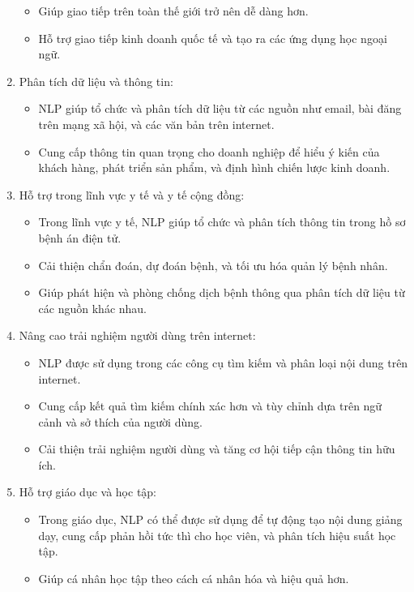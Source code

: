 \begin{enumerate}
\begin{itemize}
            \item Giúp giao tiếp trên toàn thế giới trở nên dễ dàng hơn.
            \item Hỗ trợ giao tiếp kinh doanh quốc tế và tạo ra các ứng dụng học ngoại ngữ.
        \end{itemize}
        \clearpage
        \item Phân tích dữ liệu và thông tin:
        \begin{itemize}
            \item NLP giúp tổ chức và phân tích dữ liệu từ các nguồn như email, bài đăng trên mạng xã hội, và các văn bản trên internet.
            \item Cung cấp thông tin quan trọng cho doanh nghiệp để hiểu ý kiến của khách hàng, phát triển sản phẩm, và định hình chiến lược kinh doanh.
        \end{itemize}
        \item Hỗ trợ trong lĩnh vực y tế và y tế cộng đồng:
        \begin{itemize}
            \item Trong lĩnh vực y tế, NLP giúp tổ chức và phân tích thông tin trong hồ sơ bệnh án điện tử.
            \item Cải thiện chẩn đoán, dự đoán bệnh, và tối ưu hóa quản lý bệnh nhân.
            \item Giúp phát hiện và phòng chống dịch bệnh thông qua phân tích dữ liệu từ các nguồn khác nhau.
        \end{itemize}
        
        \item Nâng cao trải nghiệm người dùng trên internet:
        \begin{itemize}
            \item NLP được sử dụng trong các công cụ tìm kiếm và phân loại nội dung trên internet.
            \item Cung cấp kết quả tìm kiếm chính xác hơn và tùy chỉnh dựa trên ngữ cảnh và sở thích của người dùng.
            \item Cải thiện trải nghiệm người dùng và tăng cơ hội tiếp cận thông tin hữu ích.
        \end{itemize}
        \item Hỗ trợ giáo dục và học tập:
        \begin{itemize}
            \item Trong giáo dục, NLP có thể được sử dụng để tự động tạo nội dung giảng dạy, cung cấp phản hồi tức thì cho học viên, và phân tích hiệu suất học tập.
            \item Giúp cá nhân học tập theo cách cá nhân hóa và hiệu quả hơn.
        \end{itemize}
\end{enumerate}

